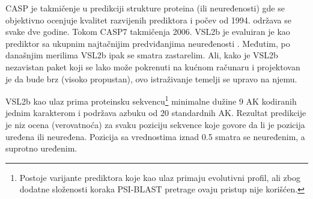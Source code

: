 CASP  je takmičenje u
predikciji strukture proteina (ili neuređenosti) gde se objektivno ocenjuje
kvalitet razvijenih prediktora i počev od 1994. održava se svake dve godine.
Tokom CASP7 takmičenja 2006. VSL2b je evaluiran je kao prediktor sa ukupnim
najtačnijim predviđanjima neuređenosti \parencite{He2009}. Međutim, po
današnjim merilima \parencite{Meng2017} VSL2b ipak se smatra zastarelim.  Ali,
kako je VSL2b nezavistan paket koji se lako može pokrenuti na kućnom računaru i
projektovan je da bude brz (visoko propustan), ovo istraživanje temelji se
upravo na njemu.

VSL2b kao ulaz prima proteinsku sekvencu\footnote{
  Postoje varijante prediktora koje kao ulaz primaju evolutivni profil, ali zbog
  dodatne složenosti koraka PSI-BLAST pretrage ovaju pristup nije korišćen.
}
minimalne dužine 9 AK kodiranih jednim
karakterom i podržava azbuku od 20 standardnih AK. Rezultat predikcije je niz
ocena (verovatnoća) za svaku poziciju sekvence
koje govore da li je pozicija uređena ili neuređena. Pozicija sa vrednostima iznad
0.5 smatra se neuređenim, a suprotno uređenim.





